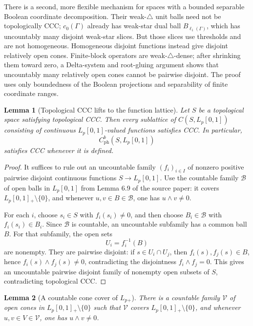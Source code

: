 \documentclass[11pt]{article}
\newtheorem{lemma}{Lemma}
\newcommand{\Lp}{L_p[0,1]}
\newcommand{\ph}{\mathrm{ph}}
\begin{document}
There is a second, more flexible mechanism for spaces with a bounded
separable Boolean coordinate decomposition.  Their weak-\(\triangle\) unit
balls need not be topologically CCC; \(c_0(\Gamma)\) already has weak-star dual
ball \(B_{\ell_1(\Gamma)}\), which has uncountably many disjoint weak-star
slices.  But those slices use thresholds and are not homogeneous.  Homogeneous
disjoint functions instead give disjoint relatively open cones.  Finite-block
operators are weak-\(\triangle\)-dense; after shrinking them toward zero, a
Delta-system and root-gluing argument shows that uncountably many relatively
open cones cannot be pairwise disjoint.  The proof uses only boundedness of
the Boolean projections and separability of finite coordinate ranges.

\begin{lemma}[Topological CCC lifts to the function lattice]
\label{lem:lift}
Let \(S\) be a topological space satisfying topological CCC.  Then every
sublattice of \(C(S,\Lp)\) consisting of continuous \(\Lp\)-valued functions
satisfies CCC.  In particular,
\[
  C_{\ph}^b(S,\Lp)
\]
satisfies CCC whenever it is defined.
\end{lemma}

\begin{proof}
It suffices to rule out an uncountable family \((f_i)_{i\in I}\) of nonzero
positive pairwise disjoint continuous functions \(S\to\Lp\).  Use the
countable family \(\mathcal B\) of open balls in \(\Lp\) from Lemma 6.9 of the
source paper: it covers \(\Lp{}_+\setminus\{0\}\), and whenever
\(u,v\in B\in\mathcal B\), one has \(u\wedge v\neq 0\).

For each \(i\), choose \(s_i\in S\) with \(f_i(s_i)\neq0\), and then choose
\(B_i\in\mathcal B\) with \(f_i(s_i)\in B_i\).  Since \(\mathcal B\) is
countable, an uncountable subfamily has a common ball \(B\).  For that
subfamily, the open sets
\[
  U_i=f_i^{-1}(B)
\]
are nonempty.  They are pairwise disjoint: if \(s\in U_i\cap U_j\), then
\(f_i(s),f_j(s)\in B\), hence \(f_i(s)\wedge f_j(s)\neq0\), contradicting
the disjointness \(f_i\wedge f_j=0\).  This gives an uncountable pairwise
disjoint family of nonempty open subsets of \(S\), contradicting topological
CCC.
\end{proof}

\begin{lemma}[A countable cone cover of \(L_p{}_+\)]
\label{lem:cone-cover}
There is a countable family \(\mathcal V\) of open cones in
\(\Lp{}_+\setminus\{0\}\) such that \(\mathcal V\) covers
\(\Lp{}_+\setminus\{0\}\), and whenever \(u,v\in V\in\mathcal V\), one has
\(u\wedge v\neq0\).
\end{lemma}
\end{document}

